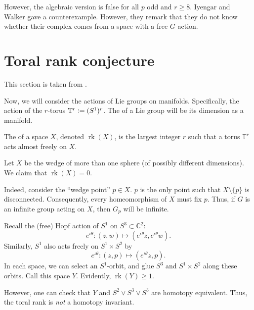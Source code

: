 \documentclass[12pt]{article}
\DeclareMathOperator{\rk}{rk}
\begin{document}
However, the algebraic version is false for all $p$ odd and $r \ge 8$. Iyengar and Walker \cite{IyengarWalkerFiniteFreeComplexesSmallRankHomology} gave a counterexample. However, they remark that they do not know whether their complex comes from a space with a free $G$-action.

\section{Toral rank conjecture}

This section is taken from \cite{FelixOpreaTanreAlgebraicModels}.

Now, we will consider the actions of Lie groups on manifolds. Specifically, the action of the $r$-torus $\mathbb{T}^{r} \vcentcolon= (S^{1})^{r}$. The  of a Lie group will be its dimension as a manifold.

\begin{defn}
	The  of a space $X$, denoted $\rk(X)$, is the largest integer $r$ such that a torus $\mathbb{T}^{r}$ acts almost freely on $X$.
\end{defn}

\begin{ex}
	Let $X$ be the wedge of more than one sphere (of possibly different dimensions). We claim that $\rk(X) = 0$. 

	Indeed, consider the ``wedge point'' $p \in X$. $p$ is the only point such that $X \setminus \{p\}$ is disconnected. Consequently, every homeomorphism of $X$ must fix $p$. Thus, if $G$ is an infinite group acting on $X$, then $G_{p}$ will be infinite.
\end{ex}

\begin{ex}
	Recall the (free) Hopf action of $S^{1}$ on $S^{3} \subset \mathbb{C}^{2}$:
	\begin{equation*} 
		e^{\iota \theta} : (z, w) \mapsto (e^{\iota \theta} z, e^{\iota \theta} w).	
	\end{equation*}
	Similarly, $S^{1}$ also acts freely on $S^{1} \times S^{2}$ by
	\begin{equation*} 
		e^{\iota \theta} : (z, p) \mapsto (e^{\iota \theta} z, p).	
	\end{equation*}
	In each space, we can select an $S^{1}$-orbit, and glue $S^{3}$ and $S^{1} \times S^{2}$ along these orbits. Call this space $Y$. Evidently, $\rk(Y) \ge 1$.

	However, one can check that $Y$ and $S^{2} \vee S^{3} \vee S^{3}$ are homotopy equivalent. Thus, the toral rank is \emph{not} a homotopy invariant.
\end{ex}
\end{document}
